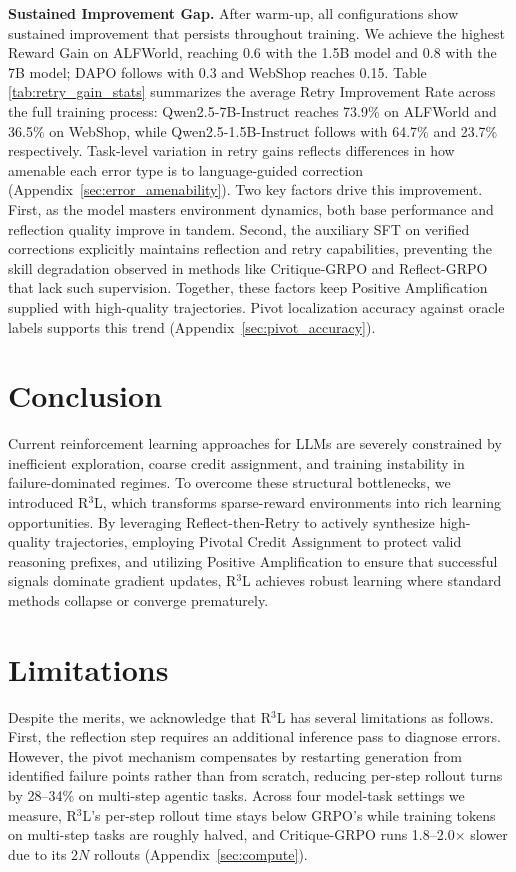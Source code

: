 \documentclass{article} %
\theoremstyle{definition}
\theoremstyle{remark}
\begin{document}
\textbf{Sustained Improvement Gap.} After warm-up, all configurations show sustained improvement that persists throughout training. We achieve the highest Reward Gain on ALFWorld, reaching 0.6 with the 1.5B model and 0.8 with the 7B model; DAPO follows with 0.3 and WebShop reaches 0.15. Table \ref{tab:retry_gain_stats} summarizes the average Retry Improvement Rate across the full training process: Qwen2.5-7B-Instruct reaches 73.9\% on ALFWorld and 36.5\% on WebShop, while Qwen2.5-1.5B-Instruct follows with 64.7\% and 23.7\% respectively. Task-level variation in retry gains reflects differences in how amenable each error type is to language-guided correction (Appendix~\ref{sec:error_amenability}).
Two key factors drive this improvement. First, as the model masters environment dynamics, both base performance and reflection quality improve in tandem. Second, the auxiliary SFT on verified corrections explicitly maintains reflection and retry capabilities, preventing the skill degradation observed in methods like Critique-GRPO and Reflect-GRPO that lack such supervision. Together, these factors keep Positive Amplification supplied with high-quality trajectories. Pivot localization accuracy against oracle labels supports this trend (Appendix~\ref{sec:pivot_accuracy}).

\section{Conclusion}
Current reinforcement learning approaches for LLMs are severely constrained by inefficient exploration, coarse credit assignment, and training instability in failure-dominated regimes. To overcome these structural bottlenecks, we introduced R$^3$L, which transforms sparse-reward environments into rich learning opportunities. By leveraging Reflect-then-Retry to actively synthesize high-quality trajectories, employing Pivotal Credit Assignment to protect valid reasoning prefixes, and utilizing Positive Amplification to ensure that successful signals dominate gradient updates, R$^3$L achieves robust learning where standard methods collapse or converge prematurely.

\section*{Limitations}
Despite the merits, we acknowledge that R$^3$L has several limitations as follows. First, the reflection step requires an additional inference pass to diagnose errors. However, the pivot mechanism compensates by restarting generation from identified failure points rather than from scratch, reducing per-step rollout turns by 28--34\% on multi-step agentic tasks. Across four model-task settings we measure, R$^3$L's per-step rollout time stays below GRPO's while training tokens on multi-step tasks are roughly halved, and Critique-GRPO runs 1.8--2.0$\times$ slower due to its $2N$ rollouts (Appendix~\ref{sec:compute}).
\end{document}
